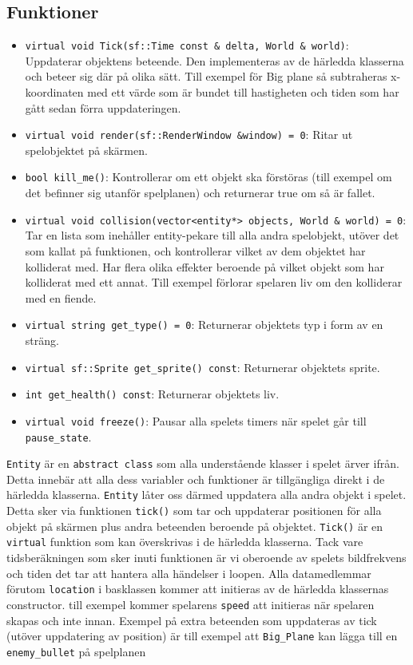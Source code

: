 \documentclass{TDP003mall}
\begin{document}
\subsection{Funktioner}
\begin{itemize}
\item \texttt{virtual void Tick(sf::Time const \& delta, World \& world)}: Uppdaterar objektens beteende. 
Den implementeras av de härledda klasserna och beteer sig där på olika sätt. 
Till exempel för Big plane så subtraheras x-koordinaten med ett värde som är bundet till hastigheten och tiden som har gått sedan förra uppdateringen.
\item \texttt{virtual void render(sf::RenderWindow \&window) = 0}: Ritar ut spelobjektet på skärmen.
\item \texttt{bool kill\_me()}: Kontrollerar om ett objekt ska förstöras (till exempel om det befinner sig utanför spelplanen) och returnerar true om så är fallet.
\item \texttt{virtual void collision(vector<entity*> objects, World \& world) = 0}: Tar en lista som inehåller entity-pekare till alla andra spelobjekt, 
utöver det som kallat på funktionen, och kontrollerar vilket av  dem objektet har kolliderat med. 
Har flera olika effekter beroende på vilket objekt som har kolliderat med ett annat. 
Till exempel förlorar spelaren liv om den kolliderar med en fiende. 
\item \texttt{virtual string get\_type() = 0}: Returnerar objektets typ i form av en sträng.
\item \texttt{virtual sf::Sprite get\_sprite() const}: Returnerar objektets sprite.
\item \texttt{int get\_health() const}: Returnerar objektets liv.
\item \texttt{virtual void freeze()}: Pausar alla spelets timers när spelet går till \texttt{pause\_state}.

\end{itemize}

\texttt{Entity} är en \texttt{abstract class} som alla understående klasser i spelet ärver ifrån. 
Detta innebär att alla dess variabler och funktioner är tillgängliga direkt i de härledda klasserna.
\texttt{Entity} låter oss därmed uppdatera alla andra objekt i spelet. 
Detta sker via funktionen \texttt{tick()} som tar och uppdaterar positionen för alla objekt på skärmen plus andra beteenden beroende på objektet. 
\texttt{Tick()} är en \texttt{virtual} funktion som kan överskrivas i de härledda klasserna.
Tack vare tidsberäkningen som sker inuti funktionen är vi oberoende av spelets bildfrekvens och tiden det tar att hantera alla händelser i loopen.
Alla datamedlemmar förutom \texttt{location} i basklassen kommer att initieras av de härledda klassernas constructor. 
till exempel kommer spelarens \texttt{speed} att initieras när spelaren skapas och inte innan.
Exempel på extra beteenden som uppdateras av tick (utöver uppdatering av position) är till exempel att \texttt{Big\_Plane} kan lägga till en \texttt{enemy\_bullet} på spelplanen
\end{document}
